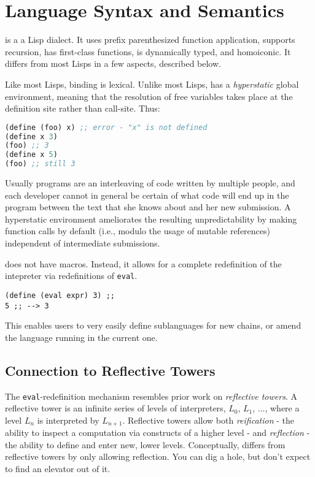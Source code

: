\section{Language Syntax and Semantics}

\rad is a a Lisp dialect. It uses prefix parenthesized function application,
supports recursion, has first-class functions, is dynamically typed, and
homoiconic. It differs from most Lisps in a few aspects, described below.

Like most Lisps, binding is lexical. Unlike most Lisps, \rad has a
\textit{hyperstatic} global environment, meaning that the resolution of free
variables takes place at the definition site rather than call-site. Thus:

\begin{lstlisting}[language=Lisp, basicstyle=\small\ttfamily]
(define (foo) x) ;; error - "x" is not defined
(define x 3)
(foo) ;; 3
(define x 5)
(foo) ;; still 3
\end{lstlisting}

Usually \rad programs are an interleaving of code written by multiple people,
and each developer cannot in general be certain of what code will end up in the
program between the text that she knows about and her new submission. A
hyperstatic environment ameliorates the resulting unpredictability by making
function calls by default (i.e., modulo the usage of mutable references)
independent of intermediate submissions.

\rad does not have macros. Instead, it allows for a complete redefinition of
the intepreter via redefinitions of \texttt{eval}.

\begin{lstlisting}[basicstyle=\small\ttfamily]
(define (eval expr) 3) ;;
5 ;; --> 3
\end{lstlisting}

This enables users to very easily define sublanguages for new chains, or amend
the language running in the current one.

\subsection{Connection to Reflective Towers} The \texttt{eval}-redefinition
mechanism resembles prior work on \textit{reflective towers}. A reflective
tower is an infinite series of levels of interpreters, $L_0$, $L_1$, ..., where
a level $L_n$ is interpreted by $L_{n+1}$. Reflective towers allow both
\textit{reification} - the ability to inspect a computation via constructs of a
higher level - and \textit{reflection} - the ability to define and enter new,
lower levels. Conceptually, \rad differs from reflective towers by only
allowing reflection. You can dig a hole, but don't expect to find an elevator
out of it.

